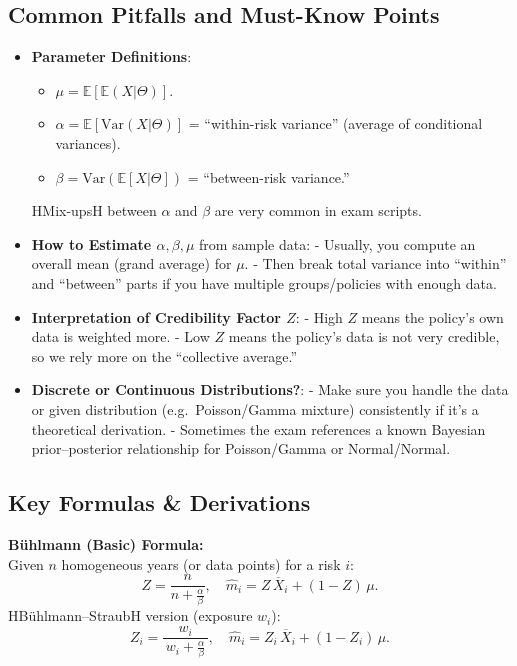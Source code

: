 \documentclass[13pt,a4paper]{article}
\begin{document}
\subsection{Common Pitfalls and Must-Know Points}
\begin{itemize}
  \item \textbf{Parameter Definitions}:
    \begin{itemize}
      \item \(\mu = \mathbb{E}[\mathbb{E}(X|\Theta)]\).
      \item \(\alpha = \mathbb{E}[\mathrm{Var}(X|\Theta)]\) = “within-risk variance” (average of conditional variances).
      \item \(\beta = \mathrm{Var}(\mathbb{E}[X|\Theta])\) = “between-risk variance.”
    \end{itemize}
    HMix-upsH between \(\alpha\) and \(\beta\) are very common in exam scripts.
  \item \textbf{How to Estimate \(\alpha,\beta,\mu\)} from sample data:
    - Usually, you compute an overall mean (grand average) for \(\mu\).  
    - Then break total variance into “within” and “between” parts if you have multiple groups/policies with enough data.
  \item \textbf{Interpretation of Credibility Factor \(Z\)}:
    - High \(Z\) means the policy’s own data is weighted more.  
    - Low \(Z\) means the policy’s data is not very credible, so we rely more on the “collective average.”
  \item \textbf{Discrete or Continuous Distributions?}:
    - Make sure you handle the data or given distribution (e.g.\ Poisson/Gamma mixture) consistently if it’s a theoretical derivation.  
    - Sometimes the exam references a known Bayesian prior–posterior relationship for Poisson/Gamma or Normal/Normal.
\end{itemize}

\subsection{Key Formulas \& Derivations}
\noindent\textbf{B\"{u}hlmann (Basic) Formula:}\\
Given \(n\) homogeneous years (or data points) for a risk \(i\):
\[
  Z = \frac{n}{n + \frac{\alpha}{\beta}}, 
  \quad
  \hat{m}_i = Z\, \overline{X}_i + (1-Z)\,\mu.
\]
\noindent
HB\"{u}hlmann--StraubH version (exposure \(w_i\)):
\[
  Z_i = \frac{w_i}{\,w_i + \frac{\alpha}{\beta}\,}, 
  \quad
  \hat{m}_i = Z_i\, \overline{X}_i + (1-Z_i)\,\mu.
\]
\end{document}
